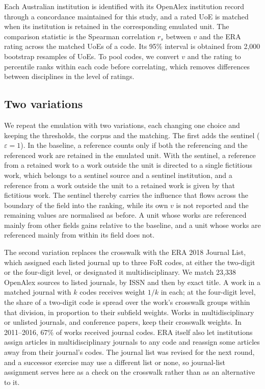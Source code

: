 Each Australian institution is identified with its OpenAlex institution record through a concordance maintained for this study, and a rated UoE is matched when its institution is retained in the corresponding emulated unit. The comparison statistic is the Spearman correlation $r_s$ between $v$ and the ERA rating across the matched UoEs of a code. Its 95\% interval is obtained from 2,000 bootstrap resamples of UoEs. To pool codes, we convert $v$ and the rating to percentile ranks within each code before correlating, which removes differences between disciplines in the level of ratings.

\subsection{Two variations}

We repeat the emulation with two variations, each changing one choice and keeping the thresholds, the corpus and the matching. The first adds the sentinel ($\varepsilon = 1$). In the baseline, a reference counts only if both the referencing and the referenced work are retained in the emulated unit. With the sentinel, a reference from a retained work to a work outside the unit is directed to a single fictitious work, which belongs to a sentinel source and a sentinel institution, and a reference from a work outside the unit to a retained work is given by that fictitious work. The sentinel thereby carries the influence that flows across the boundary of the field into the ranking, while its own $v$ is not reported and the remaining values are normalised as before. A unit whose works are referenced mainly from other fields gains relative to the baseline, and a unit whose works are referenced mainly from within its field does not.

The second variation replaces the crosswalk with the ERA 2018 Journal List, which assigned each listed journal up to three FoR codes, at either the two-digit or the four-digit level, or designated it multidisciplinary. We match 23,338 OpenAlex sources to listed journals, by ISSN and then by exact title. A work in a matched journal with $k$ codes receives weight $1/k$ in each; at the four-digit level, the share of a two-digit code is spread over the work's crosswalk groups within that division, in proportion to their subfield weights. Works in multidisciplinary or unlisted journals, and conference papers, keep their crosswalk weights. In 2011--2016, 67\% of works received journal codes. ERA itself also let institutions assign articles in multidisciplinary journals to any code and reassign some articles away from their journal's codes. The journal list was revised for the next round, and a successor exercise may use a different list or none, so journal-list assignment serves here as a check on the crosswalk rather than as an alternative to it.
